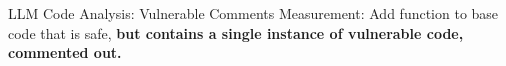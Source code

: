 \documentclass[aspectratio=169]{beamer}
\begin{document}
\begin{frame}{LLM Code Analysis: Vulnerable Comments}
Measurement: Add function to base code that is safe, \textbf{but contains a single instance of vulnerable code, commented out.}
\end{frame}
\end{document}
